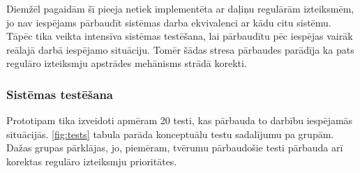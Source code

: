 Diemžēl pagaidām šī pieeja netiek implementēta ar daļiņu regulārām izteiksmēm, jo nav iespējams pārbaudīt sistēmas darba ekvivalenci ar kādu citu sistēmu. Tāpēc tika veikta intensīva sistēmas testēšana, lai pārbaudītu pēc iespējas vairāk reālajā darbā iespējamo situāciju. Tomēr šādas stresa pārbaudes parādīja ka pats regulāro izteiksmju apstrādes mehānisms strādā korekti.

\subsubsection{Sistēmas testēšana}

Prototipam tika izveidoti apmēram 20 testi, kas pārbauda to darbību iespējamās situācijās. \ref{fig:tests} tabula parāda konceptuālu testu sadalījumu pa grupām. Dažas grupas pārklājas, jo, piemēram, tvērumu pārbaudošie testi pārbauda arī korektas regulāro izteiksmju prioritātes.

